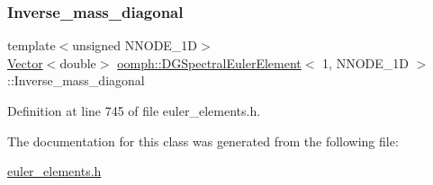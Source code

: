 \subsubsection{\texorpdfstring{Inverse\+\_\+mass\+\_\+diagonal}{Inverse\_mass\_diagonal}}
{\footnotesize\ttfamily template$<$unsigned N\+N\+O\+D\+E\+\_\+1D$>$ \\
\hyperlink{classoomph_1_1Vector}{Vector}$<$double$>$ \hyperlink{classoomph_1_1DGSpectralEulerElement}{oomph\+::\+D\+G\+Spectral\+Euler\+Element}$<$ 1, N\+N\+O\+D\+E\+\_\+1D $>$\+::Inverse\+\_\+mass\+\_\+diagonal\hspace{0.3cm}{\ttfamily [private]}}



Definition at line 745 of file euler\+\_\+elements.\+h.



The documentation for this class was generated from the following file\+:\begin{DoxyCompactItemize}
\item 
\hyperlink{euler__elements_8h}{euler\+\_\+elements.\+h}\end{DoxyCompactItemize}

